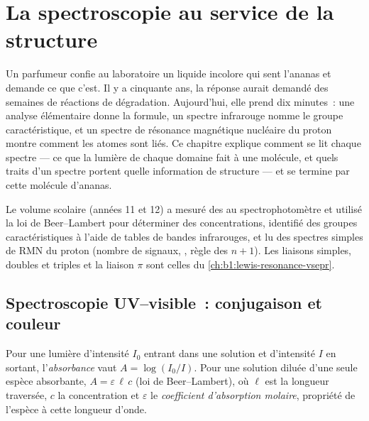 \chapter{La spectroscopie au service de la structure}\label{ch:b1:structure-spectroscopy}

Un parfumeur confie au laboratoire un liquide incolore qui sent l'ananas
et demande ce que c'est. Il y a cinquante ans, la réponse aurait demandé
des semaines de réactions de dégradation. Aujourd'hui, elle prend dix
minutes~: une analyse élémentaire donne la formule, un spectre
infrarouge nomme le groupe caractéristique, et un spectre de résonance
magnétique nucléaire du proton montre comment les atomes sont liés. Ce
chapitre explique comment se lit chaque spectre --- ce que la lumière de
chaque domaine fait à une molécule, et quels traits d'un spectre portent
quelle information de structure --- et se termine par cette molécule
d'ananas.

\begin{recall}
Le volume scolaire (années 11 et 12) a mesuré des  au
spectrophotomètre et utilisé la loi de Beer--Lambert pour déterminer des
concentrations, identifié des groupes caractéristiques à l'aide de tables
de bandes infrarouges, et lu des spectres simples de RMN du proton
(nombre de signaux, , règle des $n + 1$). Les liaisons
simples, doubles et triples et la liaison $\pi$ sont celles du
\cref{ch:b1:lewis-resonance-vsepr}.
\end{recall}

\section{Spectroscopie UV--visible~: conjugaison et couleur}

\begin{definition}\label{def:b1:structure-spectroscopy:absorbance}
Pour une lumière d'intensité $I_0$ entrant dans une solution et
d'intensité $I$ en sortant, l'\emph{absorbance} vaut
$A = \log(I_0/I)$. Pour une solution diluée d'une seule espèce
absorbante, $A = \varepsilon\,\ell\,c$ (loi de Beer--Lambert), où $\ell$
est la longueur traversée, $c$ la concentration et $\varepsilon$ le
\emph{coefficient d'absorption
molaire}, propriété de l'espèce à
cette longueur d'onde.
\end{definition}

